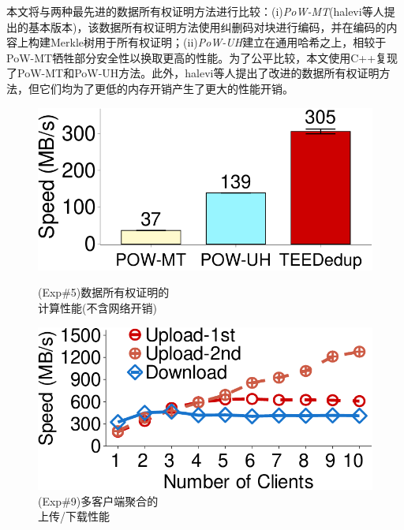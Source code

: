 本文将\sysnameS 与两种最先进的数据所有权证明方法进行比较：(i)\textit{PoW-MT}\cite{halevi11}(halevi等人提出的基本版本)，该数据所有权证明方法使用纠删码对块进行编码，并在编码的内容上构建Merkle树用于所有权证明；(ii)\textit{PoW-UH}\cite{xu2013weak}建立在通用哈希之上，相较于PoW-MT牺牲部分安全性以换取更高的性能。为了公平比较，本文使用C++复现了PoW-MT和PoW-UH方法。此外，halevi等人\cite{halevi11}提出了改进的数据所有权证明方法，但它们均为了更低的内存开销产生了更大的性能开销。

\begin{figure}[!htb]
    \begin{minipage}[t]{0.47\textwidth}
        \centering
        \includegraphics[width=\linewidth]{pic/sgxdedup/plot/exp_a4/expa4_powPerformance.pdf}
        \caption{\small(Exp\#5)数据所有权证明的\\计算性能(不含网络开销)}
        \label{fig:sgxdedup-pow-comparison}
    \end{minipage}%
    \hspace{0.2in}
    \begin{minipage}[t]{0.47\textwidth}
        \centering
        \includegraphics[width=\linewidth]{pic/sgxdedup/plot/exp_b1/expb1_multiple_client.pdf}
        \caption{(Exp\#9)多客户端聚合的\\上传/下载性能}
        \label{fig:sgxdedup-multiClientThroughput}
    \end{minipage}%
\end{figure}

